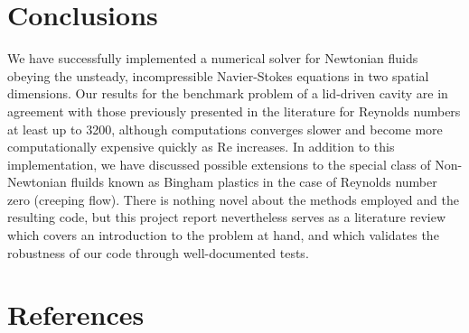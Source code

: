 \documentclass[final,3p,twocolumn]{elsarticle}
\begin{document}
\section{Conclusions}
\label{sec:conclusion}

We have successfully implemented a numerical solver for Newtonian fluids
obeying the unsteady, incompressible Navier-Stokes equations in two spatial
dimensions. Our results for the benchmark problem of a lid-driven cavity are in
agreement with those previously presented in the literature for Reynolds
numbers at least up to 3200, although computations converges slower and become
more computationally expensive quickly as Re increases.  In addition to this
implementation, we have discussed possible extensions to the special class of
Non-Newtonian fluilds known as Bingham plastics in the case of
Reynolds number zero (creeping flow). There is nothing novel about the methods
employed and the resulting code, but this project report nevertheless serves as
a literature review which covers an introduction to the problem at hand, and
which validates the robustness of our code through well-documented tests. 

\section*{References}


\end{document}
